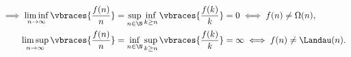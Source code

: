 \begin{solution}
\begin{enumerate}[label = (\alph*)]
  \begin{align*}
    \implies
    \liminf_{n \to \infty}
    \vbraces
    {
      \frac{f(n)}{n}
    }
    & =
    \sup_{n \in \N}
    \inf_{k \geq n}
    \vbraces
    {
      \frac{f(k)}{k}
    }
    =
    0
    \iff
    f(n) \neq \Omega(n), \\
    \limsup_{n \to \infty}
    \vbraces
    {
      \frac{f(n)}{n}
    }
    & =
    \inf_{n \in \N}
    \sup_{k \geq n}
    \vbraces
    {
      \frac{f(k)}{k}
    }
    =
    \infty
    \iff
    f(n) \neq \Landau(n).
  \end{align*}

\end{enumerate}

\end{solution}


